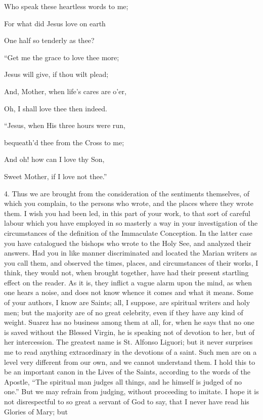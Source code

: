 Who speak these heartless words to me;

For what did Jesus love on earth

One half so tenderly as thee?

``Get me the grace to love thee more;

Jesus will give, if thou wilt plead;

And, Mother, when life's cares are o'er,

Oh, I shall love thee then indeed.

``Jesus, when His three hours were run,

bequeath'd thee from the Cross to me;

And oh! how can I love thy Son,

Sweet Mother, if I love not thee.''

4. Thus we are brought from the consideration of the sentiments
themselves, of which you complain, to the persons who wrote, and the
places where they wrote them. I wish you had been led, in this part of
your work, to that sort of careful labour which you have employed in so
masterly a way in your investigation of the circumstances of the
definition of the Immaculate Conception. In the latter case you have
catalogued the bishops who wrote to the Holy See, and analyzed their
answers. Had you in like manner discriminated and located the Marian
writers as you call them, and observed the times, places, and
circumstances of their works, I think, they would not, when brought
together, have had their present startling effect on the reader. As it
is, they inflict a vague alarm upon the mind, as when one hears a noise,
and does not know whence it comes and what it means. Some of your
authors, I know are Saints; all, I suppose, are spiritual writers and
holy men; but the majority are of no great celebrity, even if they have
any kind of weight. Suarez has no business among them at all, for, when
he says that no one is saved without the Blessed Virgin, he is speaking
not of devotion to her, but of her intercession. The greatest name is St.
Alfonso Liguori; but it never surprises me to read anything
extraordinary in the devotions of a saint. Such men are on a level very
different from our own, and we cannot understand them. I hold this to be
an important canon in the Lives of the Saints, according to the words of
the Apostle, ``The spiritual man judges all things, and he himself
is judged of no one.'' But we may refrain from judging, without
proceeding to imitate. I hope it is not disrespectful to so great a
servant of God to say, that I never have read his Glories of Mary; but
